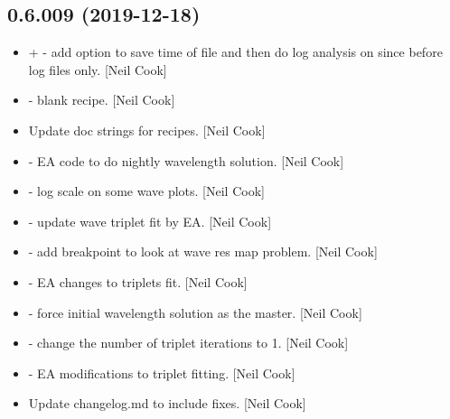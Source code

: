 \documentclass[a4paper,10pt,english]{report}
\begin{document}
\subsection{0.6.009 (2019-12-18)}
\label{\detokenize{misc/changelog:id9}}\begin{itemize}
\item {} 
 +  - add option to save time of
file and then do log analysis on \textendash{}since \textendash{}before log files only.
{[}Neil Cook{]}

\item {} 
 - blank recipe. {[}Neil Cook{]}

\item {} 
Update doc strings for recipes. {[}Neil Cook{]}

\item {} 
 - EA code to do nightly
wavelength solution. {[}Neil Cook{]}

\item {} 
 - log scale on some wave plots. {[}Neil Cook{]}

\item {} 
 - update wave triplet fit by EA. {[}Neil Cook{]}

\item {} 
 - add breakpoint to look at wave res map
problem. {[}Neil Cook{]}

\item {} 
 - EA changes to triplets fit. {[}Neil Cook{]}

\item {} 
 - force initial wavelength solution
as the master. {[}Neil Cook{]}

\item {} 
 - change the number of
triplet iterations to 1. {[}Neil Cook{]}

\item {} 
 - EA modifications to triplet fitting. {[}Neil
Cook{]}

\item {} 
Update changelog.md to include  fixes. {[}Neil Cook{]}

\end{itemize}
\end{document}

